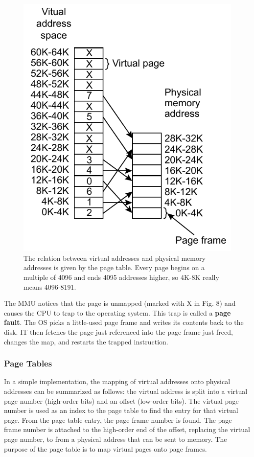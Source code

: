 \documentclass[11pt,a4paper]{article}
\begin{document}
\begin{figure}[h!]
	\centering
		\includegraphics{img/page.pdf}
	\caption{The relation between virtual addresses and physical memory addresses is given by the page table. Every page begins on a multiple of 4096 and ends 4095 addresses higher, so 4K-8K really means 4096-8191.}
\end{figure}

The MMU notices that the page is unmapped (marked with X in Fig. 8) and causes the CPU to trap to the operating system. This trap is called a \textbf{page fault}. The OS picks a little-used page frame and writes its contents back to the disk. IT then fetches the page just referenced into the page frame just freed, changes the map, and restarts the trapped instruction.

\subsubsection{Page Tables}
In a simple implementation, the mapping of virtual addresses onto physical addresses can be summarized as follows: the virtual address is split into a virtual page number (high-order bits) and an offset (low-order bits). The virtual page number is used as an index to the page table to find the entry for that virtual page. From the page table entry, the page frame number is found. The page frame number is attached to the high-order end of the offset, replacing the virtual page number, to from a physical address that can be sent to memory. The purpose of the page table is to map virtual pages onto page frames.
\end{document}
